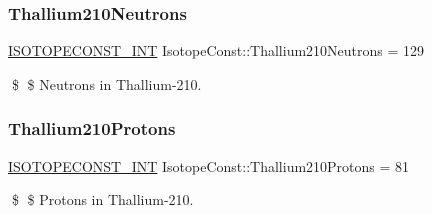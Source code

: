 \subsubsection{\texorpdfstring{Thallium210\+Neutrons}{Thallium210Neutrons}}
{\footnotesize\ttfamily \mbox{\hyperlink{group___isotope_const-_macros_ga5f18360b3e99483a35c32d789e62621c}{I\+S\+O\+T\+O\+P\+E\+C\+O\+N\+S\+T\+\_\+\+I\+NT}} Isotope\+Const\+::\+Thallium210\+Neutrons = 129}

\$ \$ Neutrons in Thallium-\/210. \mbox{\label{group___isotope_const-_thallium-_tl210_ga946d06b3365b64c15dfaacda9b75e43f}} 
\subsubsection{\texorpdfstring{Thallium210\+Protons}{Thallium210Protons}}
{\footnotesize\ttfamily \mbox{\hyperlink{group___isotope_const-_macros_ga5f18360b3e99483a35c32d789e62621c}{I\+S\+O\+T\+O\+P\+E\+C\+O\+N\+S\+T\+\_\+\+I\+NT}} Isotope\+Const\+::\+Thallium210\+Protons = 81}

\$ \$ Protons in Thallium-\/210. 